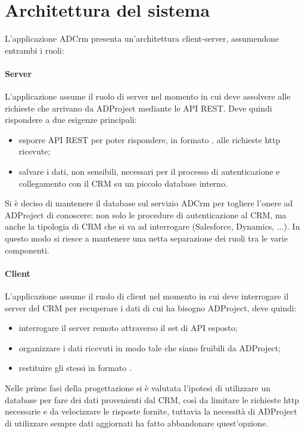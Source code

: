 \section{Architettura del sistema}
L'applicazione ADCrm presenta un'architettura client-server, assumendone entrambi i ruoli:
\paragraph{Server}
L'applicazione assume il ruolo di server nel momento in cui deve assolvere alle richieste che arrivano da ADProject mediante le API REST. Deve quindi rispondere a due esigenze principali:
\begin{itemize}
	\item esporre API REST per poter rispondere, in formato , alle richieste http ricevute;
	\item salvare i dati, non sensibili, necessari per il processo di autenticazione e collegamento con il CRM su un piccolo database interno.
\end{itemize} 

Si è deciso di mantenere il database sul servizio ADCrm per togliere l'onere ad ADProject di conoscere: non solo le procedure di autenticazione al CRM, ma anche la tipologia di CRM che si va ad interrogare (Salesforce, Dynamics, ...). In questo modo si riesce a mantenere una netta separazione dei ruoli tra le varie componenti. 

\paragraph{Client}
L'applicazione assume il ruolo di client nel momento in cui deve interrogare il server del CRM per recuperare i dati di cui ha bisogno ADProject, deve quindi:
\begin{itemize}
	\item interrogare il server remoto attraverso il set di API esposto;
	\item organizzare i dati ricevuti in modo tale che siano fruibili da ADProject;
	\item restituire gli stessi in formato .
\end{itemize}

Nelle prime fasi della progettazione si è valutata l'ipotesi di utilizzare un database per fare  dei dati provenienti dal CRM, così da limitare le richieste http necessarie e da velocizzare le risposte fornite, tuttavia la necessità di ADProject di utilizzare sempre dati aggiornati ha fatto abbandonare quest'opzione.\\

